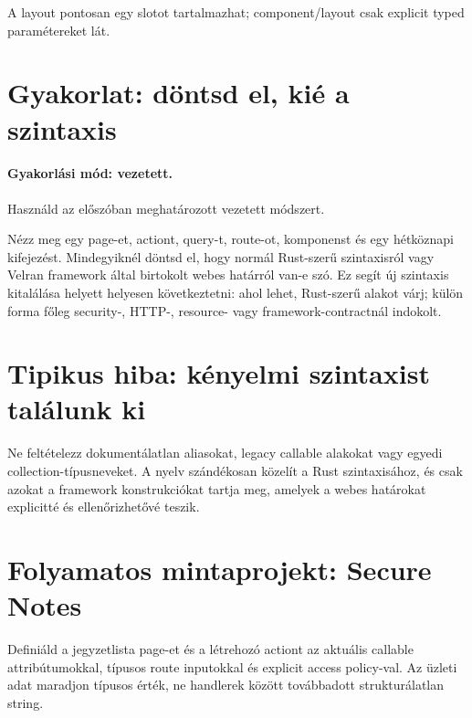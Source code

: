 A layout pontosan egy  slotot tartalmazhat; component/layout csak explicit typed paramétereket lát.

\section{Gyakorlat: döntsd el, kié a szintaxis}
\paragraph{Gyakorlási mód: vezetett.} Használd az előszóban meghatározott vezetett módszert.

Nézz meg egy page-et, actiont, query-t, route-ot, komponenst és egy hétköznapi kifejezést. Mindegyiknél döntsd el, hogy normál Rust-szerű szintaxisról vagy Velran framework által birtokolt webes határról van-e szó. Ez segít új szintaxis kitalálása helyett helyesen következtetni: ahol lehet, Rust-szerű alakot várj; külön forma főleg security-, HTTP-, resource- vagy framework-contractnál indokolt.

\section{Tipikus hiba: kényelmi szintaxist találunk ki}
Ne feltételezz dokumentálatlan aliasokat, legacy callable alakokat vagy egyedi collection-típusneveket. A nyelv szándékosan közelít a Rust szintaxisához, és csak azokat a framework konstrukciókat tartja meg, amelyek a webes határokat explicitté és ellenőrizhetővé teszik.

\section{Folyamatos mintaprojekt: Secure Notes}
Definiáld a jegyzetlista page-et és a létrehozó actiont az aktuális callable attribútumokkal, típusos route inputokkal és explicit access policy-val. Az üzleti adat maradjon típusos érték, ne handlerek között továbbadott strukturálatlan string.
